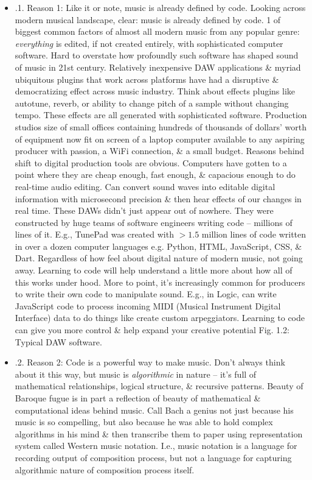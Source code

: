 \documentclass{article}
\begin{document}
\begin{itemize}
\begin{itemize}
\begin{itemize}
			\item {.1. Reason 1: Like it or note, music is already defined by code.} Looking across modern musical landscape, clear: music is already defined by code. 1 of biggest common factors of almost all modern music from any popular genre: {\it everything} is edited, if not created entirely, with sophisticated computer software. Hard to overstate how profoundly such software has shaped sound of music in 21st century. Relatively inexpensive DAW applications \& myriad ubiquitous plugins that work across platforms have had a disruptive \& democratizing effect across music industry. Think about effects plugins like autotune, reverb, or ability to change pitch of a sample without changing tempo. These effects are all generated with sophisticated software. Production studios size of small offices containing hundreds of thousands of dollars' worth of equipment now fit on screen of a laptop computer available to any aspiring producer with passion, a WiFi connection, \& a small budget. Reasons behind shift to digital production tools are obvious. Computers have gotten to a point where they are cheap enough, fast enough, \& capacious enough to do real-time audio editing. Can convert sound waves into editable digital information with microsecond precision \& then hear effects of our changes in real time. These DAWs didn't just appear out of nowhere. They were constructed by huge teams of software engineers writing code -- millions of lines of it. E.g., TunePad was created with $> 1.5$ million lines of code written in over a dozen computer languages e.g. Python, HTML, JavaScript, CSS, \& Dart. Regardless of how feel about digital nature of modern music, not going away. Learning to code will help understand a little more about how all of this works under hood. More to point, it's increasingly common for producers to write their own code to manipulate sound. E.g., in Logic, can write JavaScript code to process incoming MIDI (Musical Instrument Digital Interface) data to do things like create custom arpeggiators. Learning to code can give you more control \& help expand your creative potential {\sf Fig. 1.2: Typical DAW software}.
			\item {.2. Reason 2: Code is a powerful way to make music.} Don't always think about it this way, but music is {\it algorithmic} in nature -- it's full of mathematical relationships, logical structure, \& recursive patterns. Beauty of Baroque fugue is in part a reflection of beauty of mathematical \& computational ideas behind music. Call Bach a genius not just because his music is so compelling, but also because he was able to hold complex algorithms in his mind \& then transcribe them to paper using representation system called Western music notation. I.e., music notation is a language for recording output of composition process, but not a language for capturing algorithmic nature of composition process itself.
			

\end{itemize}
\end{itemize}
\end{itemize}
\end{document}
